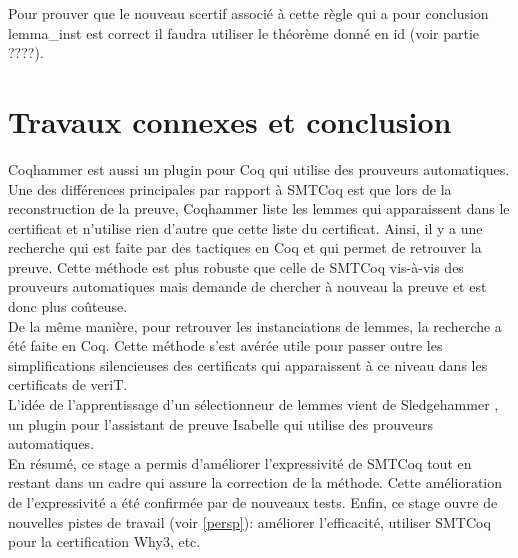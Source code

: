 \documentclass[11pt]{article}
\begin{document}
Pour prouver que le nouveau scertif associé à cette règle qui a pour conclusion lemma\_inst est correct il faudra utiliser le théorème donné en id (voir partie ????).

\section{Travaux connexes et conclusion}

Coqhammer \cite{coqhammer} est aussi un plugin pour Coq qui utilise des prouveurs automatiques. Une des différences principales par rapport à SMTCoq est que lors de la reconstruction de la preuve, Coqhammer liste les lemmes qui apparaissent dans le certificat et n'utilise rien d'autre que cette liste du certificat. Ainsi, il y a une recherche qui est faite par des tactiques en Coq et qui permet de retrouver la preuve. Cette méthode est plus robuste que celle  de SMTCoq vis-à-vis des prouveurs automatiques mais demande de chercher à nouveau la preuve et est donc plus coûteuse. \\
De la même manière, pour retrouver les instanciations de lemmes, la recherche a été faite en Coq. Cette méthode s'est avérée utile pour passer outre les simplifications silencieuses des certificats qui apparaissent à ce niveau dans les certificats de veriT. \\
L'idée de l'apprentissage d'un sélectionneur de lemmes vient de Sledgehammer \cite{sledgehammer_manual}, un plugin pour l'assistant de preuve Isabelle qui utilise des prouveurs automatiques. \\

En résumé, ce stage a permis d'améliorer l'expressivité de SMTCoq tout en restant dans un cadre qui assure la correction de la méthode. Cette amélioration de l'expressivité a été confirmée par de nouveaux tests. Enfin, ce stage ouvre de nouvelles pistes de travail (voir \ref{persp}): améliorer l'efficacité, utiliser SMTCoq pour la certification Why3, etc.



\renewcommand\refname{Bibliographie}
\nocite{*}
{}

\end{document}
